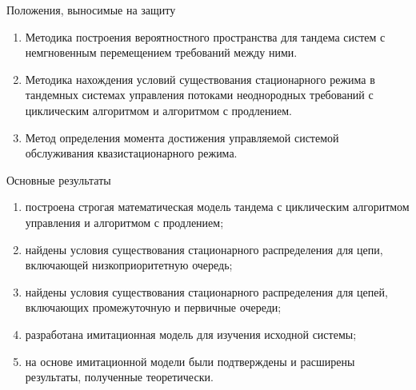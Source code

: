 \documentclass[10pt]{beamer}
\begin{document}
\begin{frame}{Положения, выносимые на защиту}
    \begin{enumerate}

\item Методика построения вероятностного пространства для
тандема систем с немгновенным перемещением требований между
ними.
\item Методика нахождения условий существования стационарного режима в тандемных системах управления потоками неоднородных требований с циклическим алгоритмом и алгоритмом с продлением.
\item Метод определения момента достижения управляемой системой обслуживания квазистационарного режима.
    \end{enumerate}
\end{frame}

\begin{frame}{Основные результаты}
    \begin{enumerate}
        \item построена строгая математическая модель тандема с циклическим алгоритмом управления и алгоритмом с продлением;
        \item найдены условия существования стационарного распределения для цепи, включающей низкоприоритетную очередь;
        \item найдены условия существования стационарного распределения для цепей, включающих промежуточную и первичные очереди;
        \item разработана имитационная модель для изучения исходной системы;
        \item на основе имитационной модели были подтверждены и расширены результаты, полученные теоретически.
    \end{enumerate}
\end{frame}
\end{document}
